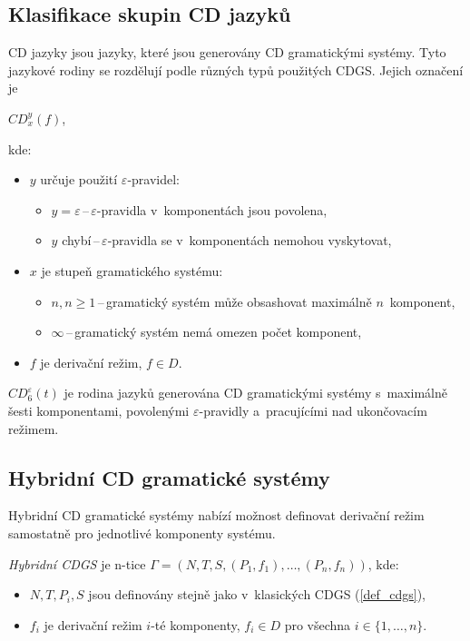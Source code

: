 \subsection*{Klasifikace skupin CD jazyků}
CD jazyky jsou jazyky, které jsou generovány CD gramatickými systémy.
Tyto jazykové rodiny se rozdělují podle různých typů použitých CDGS.
Jejich označení je
\begin{center}
    $CD^y_x(f)$,
\end{center}
kde:
\begin{itemize}
    \item $y$ určuje použití $\varepsilon$-pravidel: 
    \begin{itemize}[label=$\circ$]
        \item $y = \varepsilon$\,--\,$\varepsilon$-pravidla v~komponentách jsou povolena,
        \item $y$ chybí\,--\,$\varepsilon$-pravidla se v~komponentách nemohou vyskytovat,
    \end{itemize}
    \item $x$ je stupeň gramatického systému:
    \begin{itemize}[label=$\circ$]
        \item $n, n \geq 1$\,--\,gramatický systém může obsashovat maximálně $n$~komponent,
        \item $\infty$\,--\,gramatický systém nemá omezen počet komponent,
    \end{itemize}
    \item $f$ je derivační režim, $f \in D$.
\end{itemize}
\begin{example}
    $CD^\varepsilon_6 (t)$ je rodina jazyků generována CD gramatickými systémy s~maximálně šesti komponentami, povolenými $\varepsilon$-pravidly a~pracujícími nad ukončovacím režimem. 
\end{example}

\subsection*{Hybridní CD gramatické systémy}
Hybridní CD gramatické systémy nabízí možnost definovat derivační režim samostatně pro jednotlivé komponenty systému.
\begin{definition}
    \emph{Hybridní CDGS} je n-tice $\Gamma = (N, T, S, (P_1, f_1), \ldots, (P_n, f_n))$, kde:
    \begin{itemize}
        \item $N, T, P_i, S$ jsou definovány stejně jako v~klasických CDGS (\ref{def_cdgs}),
        \item $f_i$ je derivační režim $i$-té komponenty, $f_i \in D$ pro všechna $i \in \{1, \ldots, n\}$.
    \end{itemize}
\end{definition}


